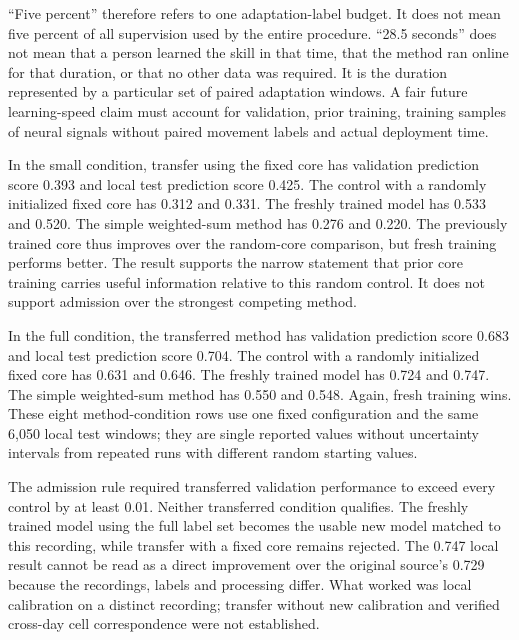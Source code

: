 ``Five percent'' therefore refers to one adaptation-label budget. It does not mean five percent of all supervision used by the entire procedure. ``28.5 seconds'' does not mean that a person learned the skill in that time, that the method ran online for that duration, or that no other data was required. It is the duration represented by a particular set of paired adaptation windows. A fair future learning-speed claim must account for validation, prior training, training samples of neural signals without paired movement labels and actual deployment time.

In the small condition, transfer using the fixed core has validation prediction score 0.393 and local test prediction score 0.425. The control with a randomly initialized fixed core has 0.312 and 0.331. The freshly trained model has 0.533 and 0.520. The simple weighted-sum method has 0.276 and 0.220. The previously trained core thus improves over the random-core comparison, but fresh training performs better. The result supports the narrow statement that prior core training carries useful information relative to this random control. It does not support admission over the strongest competing method.

In the full condition, the transferred method has validation prediction score 0.683 and local test prediction score 0.704. The control with a randomly initialized fixed core has 0.631 and 0.646. The freshly trained model has 0.724 and 0.747. The simple weighted-sum method has 0.550 and 0.548. Again, fresh training wins. These eight method-condition rows use one fixed configuration and the same 6,050 local test windows; they are single reported values without uncertainty intervals from repeated runs with different random starting values.

The admission rule required transferred validation performance to exceed every control by at least 0.01. Neither transferred condition qualifies. The freshly trained model using the full label set becomes the usable new model matched to this recording, while transfer with a fixed core remains rejected. The 0.747 local result cannot be read as a direct improvement over the original source's 0.729 because the recordings, labels and processing differ. What worked was local calibration on a distinct recording; transfer without new calibration and verified cross-day cell correspondence were not established.

\begin{center}
\begin{minipage}{\linewidth}
\centering

\end{minipage}
\end{center}

